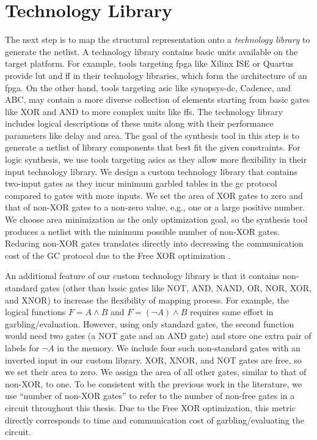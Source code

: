 \section{Technology Library}\label{sec:syn-techlib}
The next step is to map the structural representation onto a \emph{technology library} to generate the \gls{netlist}.
A technology library contains basic units available on the target platform.
For example, tools targeting \acrfull{fpga} like Xilinx ISE or Quartus provide \acrfull{lut} and \acrfull{ff} in their technology libraries, which form the architecture of an \acrshort{fpga}.
On the other hand, tools targeting \acrfull{asic} like \gls{synopsys-dc}, Cadence, and ABC, may contain a more diverse collection of elements starting from basic gates like XOR and AND to more complex units like \acrshort{ff}s.
The technology library includes logical descriptions of these units along with their performance parameters like delay and area.
The goal of the synthesis tool in this step is to generate a \gls{netlist} of library components that best fit the given constraints.
For logic synthesis, we use tools targeting \acrshort{asic}s as they allow more flexibility in their input technology library.
We design a custom technology library that contains two-input gates as they incur minimum garbled tables in the \acrshort{gc} protocol compared to gates with more inputs.
We set the area of XOR gates to zero and that of non-XOR gates to a non-zero value, e.g., one or a large positive number.
We choose area minimization as the only optimization goal, so the synthesis tool produces a \gls{netlist} with the minimum possible number of non-XOR gates.
Reducing non-XOR gates translates directly into decreasing the communication cost of the GC protocol due to the Free XOR optimization \cite{kolesnikov2008improved}.

An additional feature of our custom technology library is that it contains non-standard gates (other than basic gates like NOT, AND, NAND, OR, NOR, XOR, and XNOR) to increase the flexibility of mapping process.
For example, the logical functions $F = A\wedge B$ and $F = (\neg A)\wedge B$ requires same effort in garbling/evaluation.
However, using only standard gates, the second function would need two gates (a NOT gate and an AND gate) and store one extra pair of labels for $\neg A$ in the memory.
We include four such non-standard gates with an inverted input in our custom library.
XOR, XNOR, and NOT gates are free, so we set their area to zero.
We assign the area of all other gates, similar to that of non-XOR, to one.
To be consistent with the previous work in the literature, we use ``number of non-XOR gates'' to refer to the number of non-free gates in a circuit throughout this thesis.
Due to the Free XOR optimization, this metric directly corresponds to time and communication cost of garbling/evaluating the circuit.

